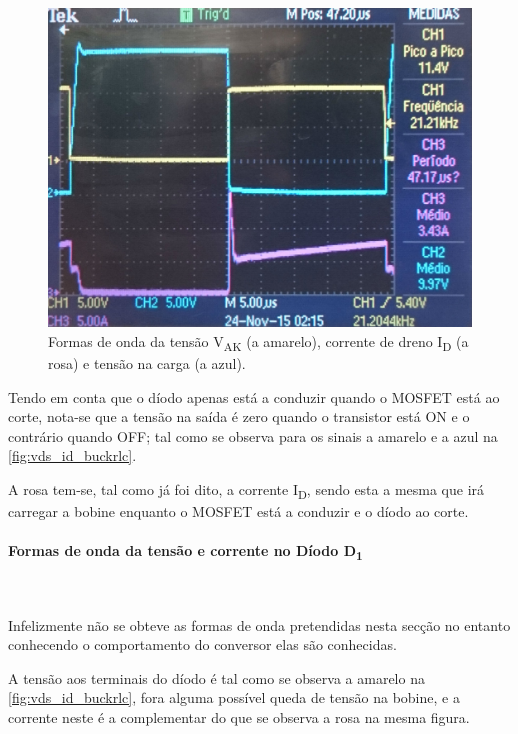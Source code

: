 \documentclass[a4paper,11pt]{article}
\numberwithin{equation}{section}
\begin{document}
\begin{figure}[H]
	\centering
	\includegraphics[keepaspectratio=true, scale=0.17]{img/figs/vds_id_buckrlc}
	\caption{Formas de onda da tensão V\textsubscript{AK} (a amarelo), corrente de dreno I\textsubscript{D} (a rosa) e tensão na carga (a azul).}
	\label{fig:vds_id_buckrlc}
	\vspace{-0.8em}
\end{figure} 

Tendo em conta que o díodo apenas está a conduzir quando o MOSFET está ao corte, nota-se que a tensão na saída é zero quando o transistor está ON e o contrário quando OFF; tal como se observa para os sinais a amarelo e a azul na \autoref{fig:vds_id_buckrlc}.

A rosa tem-se, tal como já foi dito, a corrente I\textsubscript{D}, sendo esta a mesma que irá carregar a bobine enquanto o MOSFET está a conduzir e o díodo ao corte.

\paragraph{Formas de onda da tensão e corrente no Díodo D\textsubscript{1}}\mbox{}\

Infelizmente não se obteve as formas de onda pretendidas nesta secção no entanto conhecendo o comportamento do conversor elas são conhecidas.

A tensão aos terminais do díodo é tal como se observa a amarelo na \autoref{fig:vds_id_buckrlc}, fora alguma possível queda de tensão na bobine, e a corrente neste é a complementar do que se observa a rosa na mesma figura.
\end{document}
